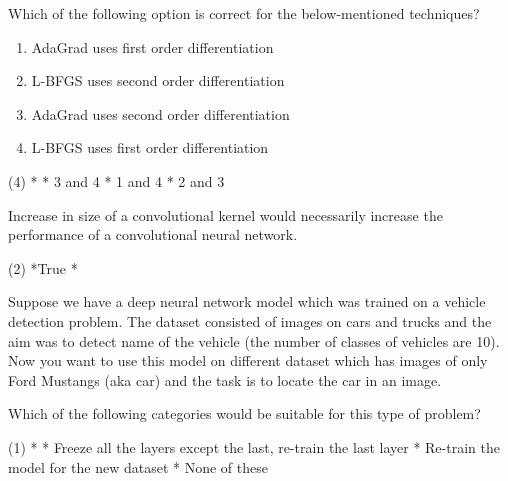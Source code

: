 \documentclass[10pt]{extarticle}
\begin{document}
\begin{exercise}
    Which of the following option is correct for the below-mentioned techniques?
    \begin{enumerate}
        \item AdaGrad uses first order differentiation
        \item L-BFGS uses second order differentiation
        \item AdaGrad uses second order differentiation
        \item L-BFGS uses first order differentiation
    \end{enumerate}
    \begin{choice} (4)
        * 
        * 3 and 4
        * 1 and 4
        * 2 and 3
    \end{choice}
\end{exercise}
\begin{solution}
\end{solution}

\begin{exercise}
    Increase in size of a convolutional kernel would necessarily increase the performance of a convolutional neural network. 
    \begin{choice} (2)
        *True
        * 
    \end{choice}
\end{exercise}
\begin{solution}
\end{solution}

\begin{exercise}
    Suppose we have a deep neural network model which was trained on a vehicle detection problem. The dataset consisted of images on cars and trucks and the aim was to detect name of the vehicle (the number of classes of vehicles are 10).
    Now you want to use this model on different dataset which has images of only Ford Mustangs (aka car) and the task is to locate the car in an image.

    Which of the following categories would be suitable for this type of problem?
    \begin{choice} (1)
        * 
        * Freeze all the layers except the last, re-train the last layer
        * Re-train the model for the new dataset
        * None of these
    \end{choice}
\end{exercise}
\begin{solution}
\end{solution}
\end{document}
